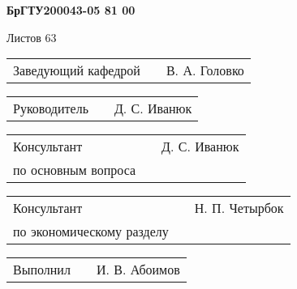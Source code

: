 \documentclass[a4paper]{article}
\begin{document}
\vspace{32pt}

\begin{Center}{
\cyrillicfontsf 
\englishfontsf
\bfseries
\fontsize{16pt}{0pt}\selectfont 
    БрГТУ200043-05 81 00
}\end{Center}

\vspace{22pt}

\begin{Center}{
\cyrillicfontsf 
\englishfontsf
\fontsize{16pt}{0pt}\selectfont 
    Листов 63
}\end{Center}

\vspace{22pt}

\begin{FlushLeft} {
\cyrillicfontsf 
\englishfontsf
\fontsize{14pt}{0pt}\selectfont 

  \begin{tabular}{p{6.5cm} p{4.767cm} p{5.633cm}}
    \raggedleft Заведующий кафедрой & & В. А. Головко  
  \end{tabular}

  \vspace{14pt}
  
  \begin{tabular}{p{6.5cm} p{4.767cm} p{5.633cm}}
    \raggedleft Руководитель & & Д. С. Иванюк \\ 
  \end{tabular}

  \vspace{14pt}

  \begin{tabular}{p{6.5cm} p{4.767cm} p{5.633cm}}
    \raggedleft Консультант & & Д. С. Иванюк \\
    \raggedleft по основным вопроса & &
  \end{tabular}

  \vspace{14pt}

  \begin{tabular}{p{6.5cm} p{4.767cm} p{5.633cm}}
    \raggedleft Консультант & & Н. П. Четырбок \\
    \raggedleft по экономическому разделу & &
  \end{tabular}

  \vspace{14pt}

  \begin{tabular}{p{6.5cm} p{4.767cm} p{5.633cm}}
    \raggedleft Выполнил & & И. В. Абоимов \\
  \end{tabular}

}
\end{FlushLeft}
\end{document}
